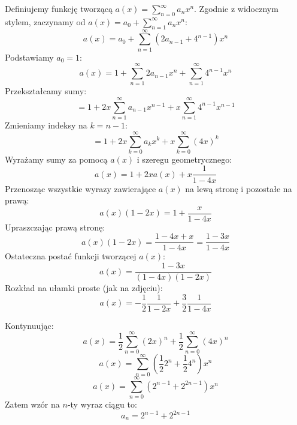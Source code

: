 \documentclass{mwart}
\begin{document}
\begin{mdframed}
    Definiujemy funkcję tworzącą $a(x) = \sum_{n=0}^{\infty} a_n x^n$.
    Zgodnie z widocznym stylem, zaczynamy od $a(x) = a_0 + \sum_{n=1}^{\infty} a_n x^n$:
    $$ a(x) = a_0 + \sum_{n=1}^{\infty} (2a_{n-1} + 4^{n-1}) x^n $$
    Podstawiamy $a_0 = 1$:
    $$ a(x) = 1 + \sum_{n=1}^{\infty} 2a_{n-1} x^n + \sum_{n=1}^{\infty} 4^{n-1} x^n $$
    Przekształcamy sumy:
    $$ = 1 + 2x \sum_{n=1}^{\infty} a_{n-1} x^{n-1} + x \sum_{n=1}^{\infty} 4^{n-1} x^{n-1} $$
    Zmieniamy indeksy na $k=n-1$:
    $$ = 1 + 2x \sum_{k=0}^{\infty} a_k x^k + x \sum_{k=0}^{\infty} (4x)^k $$
    Wyrażamy sumy za pomocą $a(x)$ i szeregu geometrycznego:
    $$ a(x) = 1 + 2x a(x) + x \frac{1}{1-4x} $$
    Przenosząc wszystkie wyrazy zawierające $a(x)$ na lewą stronę i pozostałe na prawą:
    $$ a(x) (1 - 2x) = 1 + \frac{x}{1-4x} $$
    Upraszczając prawą stronę:
    $$ a(x) (1 - 2x) = \frac{1-4x+x}{1-4x} = \frac{1-3x}{1-4x} $$
    Ostateczna postać funkcji tworzącej $a(x)$:
    $$ a(x) = \frac{1-3x}{(1-4x)(1-2x)} $$
    Rozkład na ułamki proste (jak na zdjęciu):
    $$ a(x) = -\frac{1}{2} \frac{1}{1-2x} + \frac{3}{2} \frac{1}{1-4x} $$

    Kontynuując:
    $$ a(x) = \frac{1}{2} \sum_{n=0}^{\infty} (2x)^n + \frac{1}{2} \sum_{n=0}^{\infty} (4x)^n $$
    $$ a(x) = \sum_{n=0}^{\infty} \left( \frac{1}{2} 2^n + \frac{1}{2} 4^n \right) x^n $$
    $$ a(x) = \sum_{n=0}^{\infty} (2^{n-1} + 2^{2n-1}) x^n $$
    Zatem wzór na $n$-ty wyraz ciągu to:
    $$ a_n = 2^{n-1} + 2^{2n-1} $$
\end{mdframed}
\end{document}
